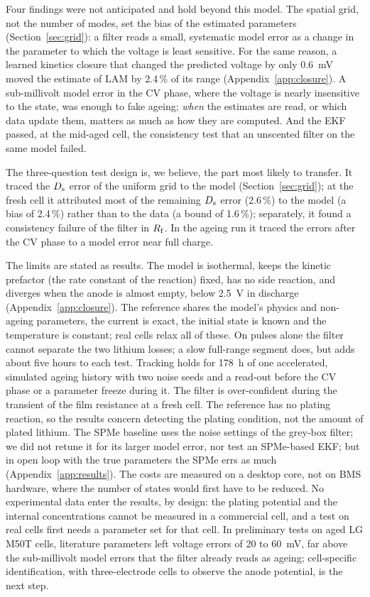 \documentclass[journal]{IEEEtran}
\newcommand{\LAM}{\mathrm{LAM}}\newcommand{\LLI}{\mathrm{LLI}}\newcommand{\phipl}{\phi_{\mathrm{pl}}}
\begin{document}
Four findings were not anticipated and hold beyond this model. The spatial grid, not the number of modes, set the bias of the estimated parameters (Section~\ref{sec:grid}): a filter reads a small, systematic model error as a change in the parameter to which the voltage is least sensitive. For the same reason, a learned kinetics closure that changed the predicted voltage by only \SI{0.6}{\milli\volt} moved the estimate of $\LAM$ by 2.4\,\% of its range (Appendix~\ref{app:closure}). A sub-millivolt model error in the CV phase, where the voltage is nearly insensitive to the state, was enough to fake ageing; \emph{when} the estimates are read, or which data update them, matters as much as how they are computed. And the EKF passed, at the mid-aged cell, the consistency test that an unscented filter on the same model failed.

The three-question test design is, we believe, the part most likely to transfer. It traced the $D_{\mathrm{s}}$ error of the uniform grid to the model (Section~\ref{sec:grid}); at the fresh cell it attributed most of the remaining $D_{\mathrm{s}}$ error (2.6\,\%) to the model (a bias of 2.4\,\%) rather than to the data (a bound of 1.6\,\%); separately, it found a consistency failure of the filter in $R_{\mathrm{f}}$. In the ageing run it traced the errors after the CV phase to a model error near full charge.

The limits are stated as results. The model is isothermal, keeps the kinetic prefactor (the rate constant of the reaction) fixed, has no side reaction, and diverges when the anode is almost empty, below \SI{2.5}{\volt} in discharge (Appendix~\ref{app:closure}). The reference shares the model's physics and non-ageing parameters, the current is exact, the initial state is known and the temperature is constant; real cells relax all of these. On pulses alone the filter cannot separate the two lithium losses; a slow full-range segment does, but adds about five hours to each test. Tracking holds for \SI{178}{\hour} of one accelerated, simulated ageing history with two noise seeds and a read-out before the CV phase or a parameter freeze during it. The filter is over-confident during the transient of the film resistance at a fresh cell. The reference has no plating reaction, so the results concern detecting the plating condition, not the amount of plated lithium. The SPMe baseline uses the noise settings of the grey-box filter; we did not retune it for its larger model error, nor test an SPMe-based EKF; but in open loop with the true parameters the SPMe errs as much (Appendix~\ref{app:results}). The costs are measured on a desktop core, not on BMS hardware, where the number of states would first have to be reduced. No experimental data enter the results, by design: the plating potential and the internal concentrations cannot be measured in a commercial cell, and a test on real cells first needs a parameter set for that cell. In preliminary tests on aged LG M50T cells\cite{kirkaldy2022}, literature parameters left voltage errors of 20 to \SI{60}{\milli\volt}, far above the sub-millivolt model errors that the filter already reads as ageing; cell-specific identification, with three-electrode cells to observe the anode potential, is the next step.
\end{document}
